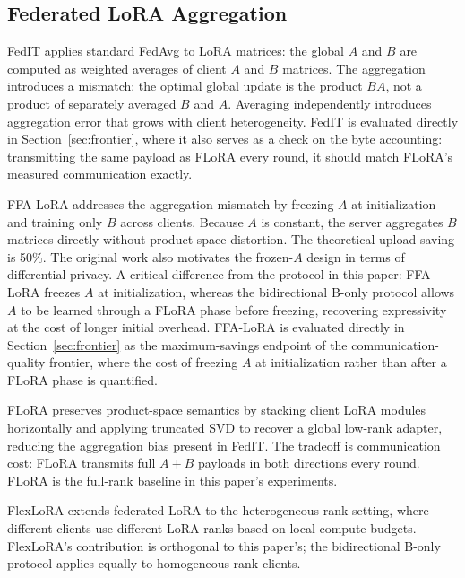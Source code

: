 \subsection{Federated LoRA Aggregation}
FedIT \citep{zhang2024federatedgpt} applies standard FedAvg \citep{mcmahan2017communication} to LoRA matrices: the global $A$ and $B$ are computed as weighted averages of client $A$ and $B$ matrices. The aggregation introduces a mismatch: the optimal global update is the product $BA$, not a product of separately averaged $B$ and $A$. Averaging independently introduces aggregation error that grows with client heterogeneity. FedIT is evaluated directly in Section~\ref{sec:frontier}, where it also serves as a check on the byte accounting: transmitting the same payload as FLoRA every round, it should match FLoRA's measured communication exactly.

FFA-LoRA \citep{sun2024ffalora} addresses the aggregation mismatch by freezing $A$ at initialization and training only $B$ across clients. Because $A$ is constant, the server aggregates $B$ matrices directly without product-space distortion. The theoretical upload saving is 50\%. The original work also motivates the frozen-$A$ design in terms of differential privacy. A critical difference from the protocol in this paper: FFA-LoRA freezes $A$ at initialization, whereas the bidirectional B-only protocol allows $A$ to be learned through a FLoRA phase before freezing, recovering expressivity at the cost of longer initial overhead. FFA-LoRA is evaluated directly in Section~\ref{sec:frontier} as the maximum-savings endpoint of the communication-quality frontier, where the cost of freezing $A$ at initialization rather than after a FLoRA phase is quantified.

FLoRA \citep{wang2024flora} preserves product-space semantics by stacking client LoRA modules horizontally and applying truncated SVD to recover a global low-rank adapter, reducing the aggregation bias present in FedIT. The tradeoff is communication cost: FLoRA transmits full $A{+}B$ payloads in both directions every round. FLoRA is the full-rank baseline in this paper's experiments.

FlexLoRA \citep{bai2024flexlora} extends federated LoRA to the heterogeneous-rank setting, where different clients use different LoRA ranks based on local compute budgets. FlexLoRA's contribution is orthogonal to this paper's; the bidirectional B-only protocol applies equally to homogeneous-rank clients.

